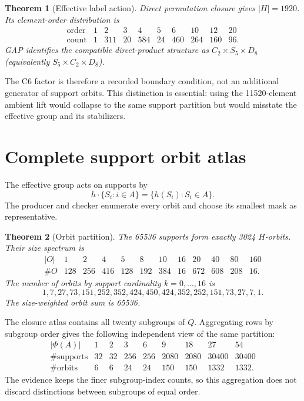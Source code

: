 \documentclass[10pt]{article}
\newtheorem{theorem}{Theorem}
\begin{document}
\begin{theorem}[Effective label action]
Direct permutation closure gives $|H|=1920$.  Its element-order
distribution is
\[
\begin{array}{c|rrrrrrrrr}
\text{order}&1&2&3&4&5&6&10&12&20\\\hline
\text{count}&1&311&20&584&24&460&264&160&96.
\end{array}
\]
GAP identifies the compatible direct-product structure as
$C_2\times S_5\times D_8$ (equivalently $S_5\times C_2\times D_8$).
\end{theorem}

The C6 factor is therefore a recorded boundary condition, not an additional
generator of support orbits.  This distinction is essential: using the
11520-element ambient lift would collapse to the same support partition but
would misstate the effective group and its stabilizers.

\section{Complete support orbit atlas}
The effective group acts on supports by
\[
 h\cdot\{S_i:i\in A\}=\{h(S_i):S_i\in A\}.
\]
The producer and checker enumerate every orbit and choose its smallest mask as
representative.

\begin{theorem}[Orbit partition]
The 65536 supports form exactly 3024 $H$-orbits.  Their size spectrum is
\[
\begin{array}{c|rrrrrrrrrrr}
|O|&1&2&4&5&8&10&16&20&40&80&160\\\hline
\#O&128&256&416&128&192&384&16&672&608&208&16.
\end{array}
\]
The number of orbits by support cardinality $k=0,\ldots,16$ is
\[
1,7,27,73,151,252,352,424,450,424,352,252,151,73,27,7,1.
\]
The size-weighted orbit sum is 65536.
\end{theorem}

The closure atlas contains all twenty subgroups of $Q$.  Aggregating rows by
subgroup order gives the following independent view of the same partition:
\[
\begin{array}{c|rrrrrrrr}
|\Phi(A)|&1&2&3&6&9&18&27&54\\\hline
\#\text{supports}&32&32&256&256&2080&2080&30400&30400\\
\#\text{orbits}&6&6&24&24&150&150&1332&1332.
\end{array}
\]
The evidence keeps the finer subgroup-index counts, so this aggregation does
not discard distinctions between subgroups of equal order.
\end{document}
